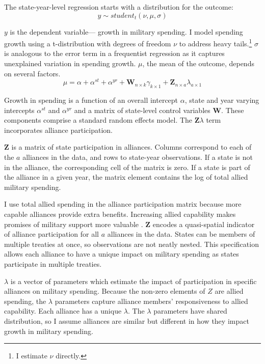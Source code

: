 \documentclass[12pt]{article}
\begin{document}
The state-year-level regression starts with a distribution for the outcome:
\begin{equation}
y \sim student_t(\nu, \mu, \sigma)
\end{equation}
 

$y$ is the dependent variable--- growth in military spending. 
I model spending growth using a t-distribution with degrees of freedom $\nu$ to address heavy tails.\footnote{I estimate $\nu$ directly.}
$\sigma$ is analogous to the error term in a frequentist regression as it captures unexplained variation in spending growth.  
$\mu$, the mean of the outcome, depends on several factors.
\begin{equation}
\mu = \alpha + \alpha^{st} + \alpha^{yr} +\textbf{W}_{n \times k} \gamma_{k \times 1}  + \textbf{Z}_{n \times a} \lambda_{a \times 1} 
\end{equation}


Growth in spending is a function of an overall intercept $\alpha$, state and year varying intercepts $\alpha^{st}$ and $\alpha^{yr}$ and a matrix of state-level control variables $\textbf{W}$.
These components comprise a standard random effects model. 
The $\textbf{Z} \lambda$ term incorporates alliance participation.


$\textbf{Z}$ is a matrix of state participation in alliances. 
Columns correspond to each of the $a$ alliances in the data, and rows to state-year observations. 
If a state is not in the alliance, the corresponding cell of the matrix is zero.
If a state is part of the alliance in a given year, the matrix element contains the log of total allied military spending.


I use total allied spending in the alliance participation matrix because more capable alliances provide extra benefits.
Increasing allied capability makes promises of military support more valuable \citep{Johnsonetal2015}. 
$\textbf{Z}$ encodes a quasi-spatial indicator of alliance participation for all $a$ alliances in the data. 
States can be members of multiple treaties at once, so observations are not neatly nested. 
This specification allows each alliance to have a unique impact on military spending as states participate in multiple treaties. 


$\lambda$ is a vector of parameters which estimate the impact of participation in specific alliances on military spending. 
Because the non-zero elements of $Z$ are allied spending, the $\lambda$ parameters capture alliance members' responsiveness to allied capability. 
Each alliance has a unique $\lambda$. 
The $\lambda$ parameters have shared distribution, so I assume alliances are similar but different in how they impact growth in military spending. 
\end{document}
